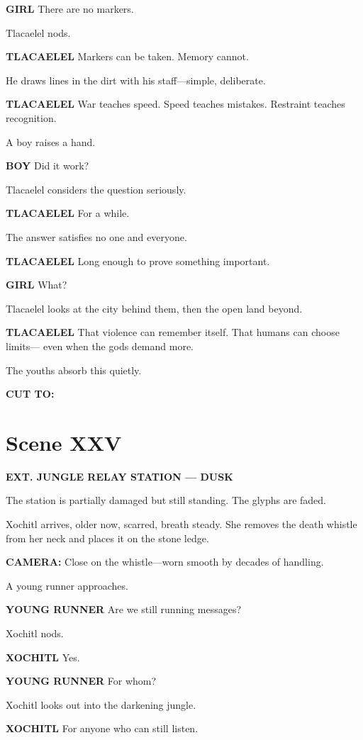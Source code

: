 \documentclass[12pt]{article}
\begin{document}
\textbf{GIRL}  
There are no markers.

Tlacaelel nods.

\textbf{TLACAELEL}  
Markers can be taken.  
Memory cannot.

He draws lines in the dirt with his staff—simple, deliberate.

\textbf{TLACAELEL}  
War teaches speed.  
Speed teaches mistakes.  
Restraint teaches recognition.

A boy raises a hand.

\textbf{BOY}  
Did it work?

Tlacaelel considers the question seriously.

\textbf{TLACAELEL}  
For a while.

The answer satisfies no one and everyone.

\textbf{TLACAELEL}  
Long enough to prove something important.

\textbf{GIRL}  
What?

Tlacaelel looks at the city behind them, then the open land beyond.

\textbf{TLACAELEL}  
That violence can remember itself.  
That humans can choose limits—  
even when the gods demand more.

The youths absorb this quietly.

\textbf{CUT TO:}

\section*{Scene XXV}

\textbf{EXT. JUNGLE RELAY STATION — DUSK}

The station is partially damaged but still standing. The glyphs are faded.

Xochitl arrives, older now, scarred, breath steady. She removes the death whistle from her neck and places it on the stone ledge.

\textbf{CAMERA:} Close on the whistle—worn smooth by decades of handling.

A young runner approaches.

\textbf{YOUNG RUNNER}  
Are we still running messages?

Xochitl nods.

\textbf{XOCHITL}  
Yes.

\textbf{YOUNG RUNNER}  
For whom?

Xochitl looks out into the darkening jungle.

\textbf{XOCHITL}  
For anyone who can still listen.
\end{document}
